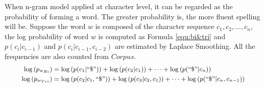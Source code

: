 When n-gram model applied at character level, it can be regarded as the probability of forming a word. 
The greater probability is, the more fluent spelling will be. 
Suppose the word $w$ is composed of the character sequence $c_1, c_2, \dots, c_n$, 
the log probability of word $w$ is computed as Formula \ref{equ:bi&tri} and $p(c_i|c_{i-1})$ and $p(c_i|c_{i-1},c_{i-2})$ are estimated by Laplace Smoothing. All the frequencies are also counted from $Corpus$.
\begin{equation}
\small
\label{equ:bi&tri} 
\begin{split}
\log\left(p_{w_{Bi}}\right)&=\log\left(p(c_1|``\$")\right)+\log\left(p(c_2|c_1)\right)+\dots+
\log\left(p(``\$"|c_n)\right)\\
\log\left(p_{w_{Tri}}\right)&=\log\left(p(c_2|c_1,``\$")\right)+\log\left(p(c_3|c_2,c_1)\right)+\dots+\log\left(p(``\$"|c_n,c_{n-1})\right)
\end{split}
\end{equation}
